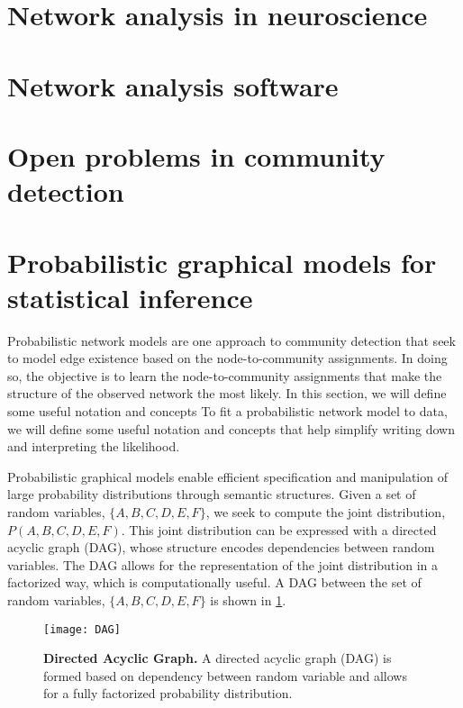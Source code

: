 \section{Network analysis in neuroscience}




\section{Network analysis software}
\section{Open problems in community detection}

\section{Probabilistic graphical models for statistical inference}
\label{pgm}
Probabilistic network models are one approach to community detection that seek to model edge existence based on the node-to-community assignments. In doing so, the objective is to learn the node-to-community assignments that make the structure of the observed network the most likely. In this section, we will define some useful notation and concepts  To fit a probabilistic network model to data, we will define some useful notation and concepts that help simplify writing down and interpreting the likelihood. 

Probabilistic graphical models enable efficient specification and manipulation of large probability distributions through semantic structures. Given a set of random variables, $\{A,B,C,D,E,F\}$, we seek to compute the joint distribution, $P(A,B,C,D,E,F)$. This joint distribution can be expressed with a directed acyclic graph (DAG), whose structure encodes dependencies between random variables. The DAG allows for the representation of the joint distribution in a factorized way, which is computationally useful. A DAG between the set of random variables, $\{A,B,C,D,E,F\}$ is shown in \ref{fig:DAG}. 

\begin{figure}
\begin{center}
\texttt{[image: DAG]}
\caption{{\bf Directed Acyclic Graph.} A directed acyclic graph (DAG) is formed based on dependency between random variable and allows for a fully factorized probability distribution.}
\label{fig:DAG}
\end{center}
\end{figure}

